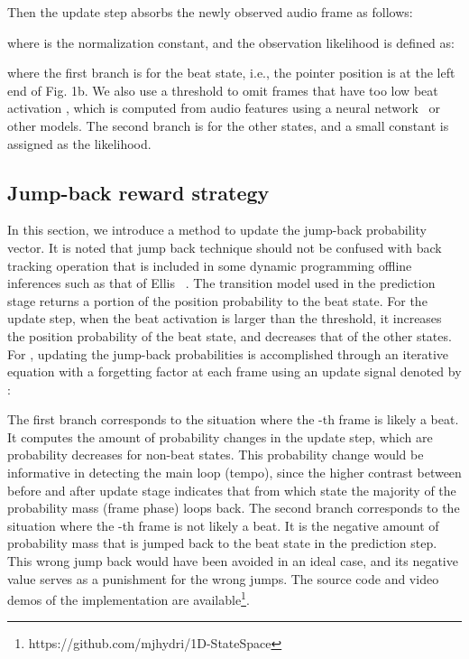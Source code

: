 \documentclass{article}
\begin{document}
Then the update step absorbs the newly observed audio frame as follows:

where  is the normalization constant, and the observation likelihood  is defined as: 

where the first branch is for the beat state, i.e., the pointer position  is at the left end of Fig. 1b. We also use a threshold  to omit frames that have too low beat activation , which is computed from audio features using a neural network~\cite{Heydari:2} or other models. The second branch is for the other states, and a small constant  is assigned as the likelihood. 






\subsection{Jump-back reward strategy}
\label{ssec:Jump back reward}

In this section, we introduce a method to update the jump-back probability vector. It is noted that jump back technique should not be confused with back tracking operation that is included in some dynamic programming offline inferences such as that of Ellis ~\cite{Ellis:1}. The transition model used in the prediction stage returns a portion of the position probability to the beat state. For the update step, when the beat activation is larger than the threshold, it increases the position probability of the beat state, and decreases that of the other states. For , updating the jump-back probabilities is accomplished through an iterative equation with a forgetting factor  at each frame using an update signal denoted by : 


The first branch corresponds to the situation where the -th frame is likely a beat. It computes the amount of probability changes in the update step, which are probability decreases for non-beat states. This probability change would be informative
in detecting the main loop (tempo), since the higher contrast between before and after update stage indicates that from which state the majority of the probability mass (frame phase) loops back.
The second branch corresponds to the situation where the -th frame is not likely a beat. It is the negative amount of probability mass that is jumped back to the beat state in the prediction step. This wrong jump back would have been avoided in an ideal case, and its negative value serves as a punishment for the wrong jumps. The source code and video demos of the implementation are available\footnote{https://github.com/mjhydri/1D-StateSpace}. 
\end{document}
